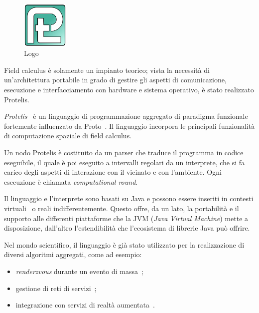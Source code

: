 \begin{figure}
  \centering
  \includegraphics[width=0.2\textwidth]{res/fig/protelis-logo.png}
  \caption{Logo}%
  \label{fig:protelis}
\end{figure}

Field calculus è solamente un impianto teorico;
vista la necessità di un'architettura portabile in grado di gestire gli aspetti di comunicazione, esecuzione e interfacciamento con hardware e sistema operativo, è stato realizzato Protelis.

\emph{Protelis}~\cite{PianiniSASOTutorial2017} è un linguaggio di programmazione aggregato di paradigma funzionale fortemente influenzato da Proto~\cite{Beal2006}.
Il linguaggio incorpora le principali funzionalità di computazione spaziale di field calculus.

Un nodo Protelis è costituito da un parser che traduce il programma in codice eseguibile, il quale è poi eseguito a intervalli regolari da un interprete, che si fa carico degli aspetti di interazione con il vicinato e con l'ambiente.
Ogni esecuzione è chiamata \emph{computational round}.

Il linguaggio e l'interprete sono basati su Java e possono essere inseriti in contesti virtuali~\cite{ProtelisSAC14} o reali indifferentemente.
Questo offre, da un lato, la portabilità e il supporto alle differenti piattaforme che la JVM (\emph{Java Virtual Machine}) mette a disposizione, dall'altro l'estendibilità che l'ecosistema di librerie Java può offrire.

Nel mondo scientifico, il linguaggio è già stato utilizzato per la realizzazione di diversi algoritmi aggregati, come ad esempio:

\begin{itemize}
  \item \emph{renderzvous} durante un evento di massa~\cite{ProtelisSAC14};
  \item gestione di reti di servizi~\cite{7306601};
  \item integrazione con servizi di realtà aumentata~\cite{PCRV-SCOPES2015}.
\end{itemize}

